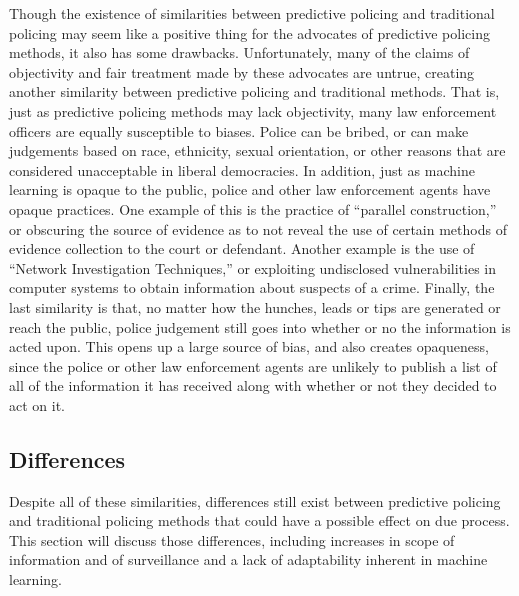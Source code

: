\documentclass[12pt]{article} %
\begin{document}
Though the existence of similarities between predictive policing and traditional policing may seem like a positive thing for the advocates of predictive policing methods, it also has some drawbacks. Unfortunately, many of the claims of objectivity and fair treatment made by these advocates are untrue, creating another similarity between predictive policing and traditional methods. That is, just as predictive policing methods may lack objectivity, many law enforcement officers are equally susceptible to biases. Police can be bribed, or can make judgements based on race, ethnicity, sexual orientation, or other reasons that are considered unacceptable in liberal democracies. In addition, just as machine learning is opaque to the public, police and other law enforcement agents have opaque practices. One example of this is the practice of ``parallel construction,'' or obscuring the source of evidence as to not reveal the use of certain methods of evidence collection to the court or defendant. \cite{cushing_2016} Another example is the use of ``Network Investigation Techniques,'' or exploiting undisclosed vulnerabilities in computer systems to obtain information about suspects of a crime. \cite{cox_jeong_2016} Finally, the last similarity is that, no matter how the hunches, leads or tips are generated or reach the public, police judgement still goes into whether or no the information is acted upon. This opens up a large source of bias, and also creates opaqueness, since the police or other law enforcement agents are unlikely to publish a list of all of the information it has received along with whether or not they decided to act on it. 

\subsection{Differences}\label{subsec:differences}
Despite all of these similarities, differences still exist between predictive policing and traditional policing methods that could have a possible effect on due process. This section will discuss those differences, including increases in scope of information and of surveillance and a lack of adaptability inherent in machine learning.
\end{document}
